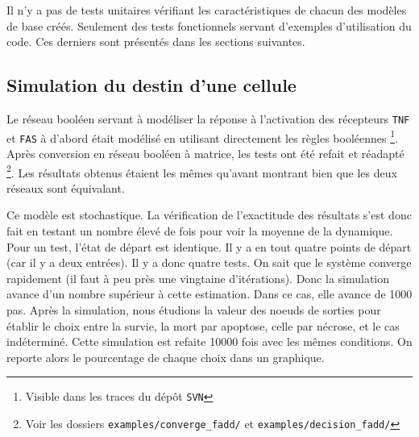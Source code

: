 \documentclass[11pt, a4paper]{article}
\begin{document}
Il n'y a pas de tests unitaires vérifiant les caractéristiques de chacun des
modèles de base créés. Seulement des tests fonctionnels servant d'exemples
d'utilisation du code. Ces derniers sont présentés dans les sections suivantes.

\subsection{Simulation du destin d'une cellule}
Le réseau booléen servant à modéliser la réponse à l'activation des récepteurs
\texttt{TNF} et \texttt{FAS} à d'abord était modélisé en utilisant directement
les règles booléennes \footnote{Visible dans les traces du dépôt \texttt{SVN}}.
Après conversion en réseau booléen à matrice, les tests ont été refait et
réadapté \footnote{Voir les dossiers \texttt{examples/converge\_fadd/} et
\texttt{examples/decision\_fadd/}}. Les résultats obtenus étaient les mêmes
qu'avant montrant bien que les deux réseaux sont équivalant.

Ce modèle est stochastique. La vérification de l'exactitude des résultats s'est
donc fait en testant un nombre élevé de fois pour voir la moyenne de la
dynamique. Pour un test, l'état de départ est identique. Il y a en tout quatre
points de départ (car il y a deux entrées). Il y a donc quatre tests. On sait
que le système converge rapidement (il faut à peu près une vingtaine
d'itérations). Donc la simulation avance d'un nombre supérieur à cette
estimation. Dans ce cas, elle avance de 1000 pas. Après la simulation, nous
étudions la valeur des noeuds de sorties pour établir le choix entre la survie,
la mort par apoptose, celle par nécrose, et le cas indéterminé. Cette
simulation est refaite 10000 fois avec les mêmes conditions. On reporte alors
le pourcentage de chaque choix dans un graphique.
\end{document}
